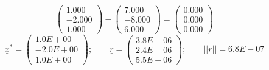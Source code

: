 \documentclass{report}[10pts]
\begin{document}
\begin{small}
\[      \begin{pmatrix}
      1.000 \\ -2.000 \\ 1.000
      \end{pmatrix}
   -
      \begin{pmatrix}
      7.000 \\ -8.000 \\ 6.000
      \end{pmatrix}
   =
      \begin{pmatrix}
      0.000 \\ 0.000 \\ 0.000
      \end{pmatrix}
\]
\[
   \underline{x}^*=
      \begin{pmatrix}
      1.0E+00 \\ -2.0E+00 \\ 1.0E+00
      \end{pmatrix}
   ;\qquad
      \underline{r}=
      \begin{pmatrix}
      3.8E-06 \\ 2.4E-06 \\ 5.5E-06
      \end{pmatrix}
   ;\qquad
   ||r||=6.8E-07
\]
\end{small}
\end{document}
